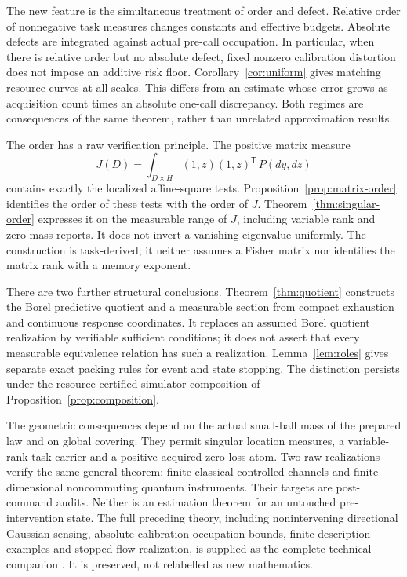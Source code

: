 The new feature is the simultaneous treatment of order and defect. Relative order of nonnegative task measures changes constants and effective budgets. Absolute defects are integrated against actual pre-call occupation. In particular, when there is relative order but no absolute defect, fixed nonzero calibration distortion does not impose an additive risk floor. Corollary~\ref{cor:uniform} gives matching resource curves at all scales. This differs from an estimate whose error grows as acquisition count times an absolute one-call discrepancy. Both regimes are consequences of the same theorem, rather than unrelated approximation results.

The order has a raw verification principle. The positive matrix measure
\[
 J(D)=\int_{D\times H}(1,z)(1,z)^\mathsf{T}\,P(dy,dz)
\]
contains exactly the localized affine-square tests. Proposition~\ref{prop:matrix-order} identifies the order of these tests with the order of $J$. Theorem~\ref{thm:singular-order} expresses it on the measurable range of $J$, including variable rank and zero-mass reports. It does not invert a vanishing eigenvalue uniformly. The construction is task-derived; it neither assumes a Fisher matrix nor identifies the matrix rank with a memory exponent.

There are two further structural conclusions. Theorem~\ref{thm:quotient} constructs the Borel predictive quotient and a measurable section from compact exhaustion and continuous response coordinates. It replaces an assumed Borel quotient realization by verifiable sufficient conditions; it does not assert that every measurable equivalence relation has such a realization. Lemma~\ref{lem:roles} gives separate exact packing rules for event and state stopping. The distinction persists under the resource-certified simulator composition of Proposition~\ref{prop:composition}.

The geometric consequences depend on the actual small-ball mass of the prepared law and on global covering. They permit singular location measures, a variable-rank task carrier and a positive acquired zero-loss atom. Two raw realizations verify the same general theorem: finite classical controlled channels and finite-dimensional noncommuting quantum instruments. Their targets are post-command audits. Neither is an estimation theorem for an untouched pre-intervention state. The full preceding theory, including nonintervening directional Gaussian sensing, absolute-calibration occupation bounds, finite-description examples and stopped-flow realization, is supplied as the complete technical companion \cite{Companion}. It is preserved, not relabelled as new mathematics.

